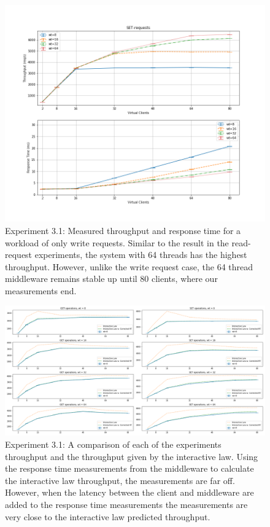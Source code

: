 \documentclass[11pt,a4paper]{article}
\begin{document}
\begin{figure}
\centering
\includegraphics[width=.9\textwidth]{31/31_set_requests}
\caption{Experiment 3.1: Measured throughput and response time for a workload of only write requests. Similar to the result in the read-request experiments, the system with 64 threads has the highest throughput. However, unlike the write request case, the 64 thread middleware remains stable up until 80 clients, where our measurements end.}
\label{fig:31_set}
\end{figure}

\begin{figure}[t]
\centering
\includegraphics[width=1\textwidth]{31/31_interactive_law}
\caption{Experiment 3.1: A comparison of each of the experiments throughput and the throughput given by the interactive law. Using the response time measurements from the middleware to calculate the interactive law throughput, the measurements are far off. However, when the latency between the client and middleware are added to the response time measurements the measurements are very close to the interactive law predicted throughput.}
\label{fig:31_interactive_law}
\end{figure}
\end{document}
